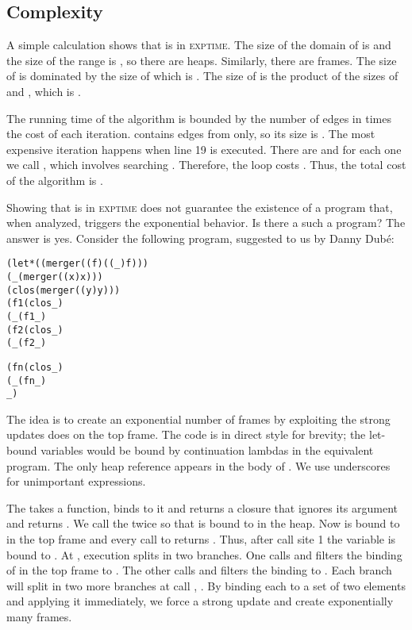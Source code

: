 \documentclass{LMCS}
\theoremstyle{definition} \newtheorem{property}[thm]{Property}
\begin{document}
\subsection{Complexity\label{subsec:complexity}}

A simple calculation shows that \cfat{} is in \textsc{exptime}.
The size of the domain of \dheap{} is  and the size of the range is ,
so there are  heaps.
Similarly, there are  frames.
The size of \dlstate{} is dominated by the size of \dlcapply{} which is
.
The size of \seen{} is the product of the sizes of \dluapply{} and \dlstate{},
which is .

The running time of the algorithm is bounded by the number of edges in \work{} 
times the cost of each iteration.
\work{} contains edges from \seen{} only, so its size is 
.
The most expensive iteration happens when line 19 is executed.
There are  \tcallers{} and for each one we call 
, which involves searching \seen.
Therefore, the loop costs 
.
Thus, the total cost of the algorithm is 
.

Showing that \cfat{} is in \textsc{exptime} does not guarantee the existence of
a program that, when analyzed, triggers the exponential behavior. 
Is there a such a program? The answer is yes.
Consider the following program, suggested to us by Danny Dub\'e:
{\footnotesize
\begin{alltt}
                        (let* ((merger   ((f) ((_) f)))
                               (_        (merger ((x) x)))
                               (clos     (merger ((y) y)))
                               (f1       (clos _)
                               (_        (f1 _)
                               (f2       (clos _)
                               (_        (f2 _)
                                       
                               (fn       (clos _)
                               (_        (fn _)
                          _ ) \end{alltt}}
The idea is to create an exponential number of frames by exploiting the strong
updates \cfat{} does on the top frame.
The code is in direct style for brevity;
the let-bound variables would be bound by continuation lambdas in the equivalent
\cps{} program. 
The only heap reference appears in the body of .
We use underscores for unimportant expressions.

The  takes a function, binds  to it and returns a closure that
ignores its argument and returns .
We call the  twice so that  is bound to 
 in the heap.
Now  is bound to  in the top frame and every call to 
returns .
Thus, after call site 1 the variable  is bound to 
.
At , execution splits in two branches.
One calls  and filters the binding of  in the top frame to
.
The other calls  and filters the binding to .
Each branch will split in two more branches at call , \etc.
By binding each  to a set of two elements and applying it immediately, we
force a strong update and create exponentially many frames.
\end{document}
